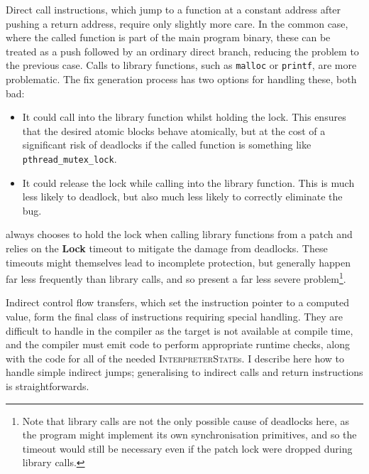 Direct call instructions, which jump to a function at a constant
address after pushing a return address, require only slightly more
care.  In the common case, where the called function is part of the
main program binary, these can be treated as a push followed by an
ordinary direct branch, reducing the problem to the previous case.
Calls to library functions, such as \texttt{malloc} or
\texttt{printf}, are more problematic.  The fix generation process has
two options for handling these, both bad:
\begin{itemize}
\item It could call into the library function whilst holding the lock.
  This ensures that the desired atomic blocks behave atomically, but
  at the cost of a significant risk of deadlocks if the called
  function is something like \texttt{pthread\_mutex\_lock}.
\item It could release the lock while calling into the library
  function.  This is much less likely to deadlock, but also much
  less likely to correctly eliminate the bug.
\end{itemize}
{\Implementation} always chooses to hold the lock when calling library
functions from a patch and relies on the \textbf{Lock} timeout to
mitigate the damage from deadlocks.  These timeouts might themselves
lead to incomplete protection, but generally happen far less
frequently than library calls, and so present a far less severe
problem\footnote{Note that library calls are not the only possible
  cause of deadlocks here, as the program might implement its own
  synchronisation primitives\cite{Jannesari2010}, and so the timeout
  would still be necessary even if the patch lock were dropped during
  library calls.}.

Indirect control flow transfers, which set the instruction pointer to
a computed value, form the final class of instructions requiring
special handling.  They are difficult to handle in the compiler as the
target is not available at compile time, and the compiler must emit
code to perform appropriate runtime checks, along with the code for
all of the needed \textsc{InterpreterState}s.  I describe here how to
handle simple indirect jumps; generalising to indirect calls and
return instructions is straightforwards.

